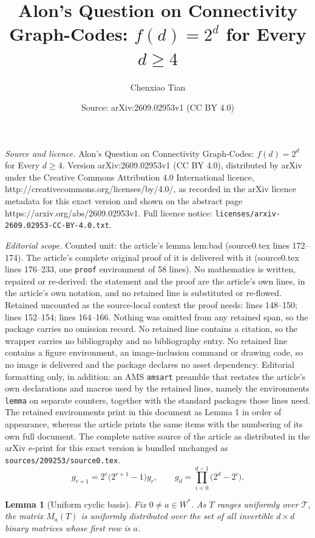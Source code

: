 \documentclass[10pt,a4paper]{amsart}
\title{Alon's Question on Connectivity Graph-Codes: $f(d)=2^d$ for Every $d\geq 4$}
\author{Chenxiao Tian}
\date{Source: arXiv:2609.02953v1 (CC BY 4.0)}
\newtheorem{lemma}{Lemma}
\begin{document}
\maketitle

\noindent\emph{Source and licence.} Alon's Question on Connectivity Graph-Codes: $f(d)=2^d$ for Every $d\geq 4$. Version arXiv:2609.02953v1 (CC BY 4.0), distributed by arXiv under the Creative Commons Attribution 4.0 International licence, http://creativecommons.org/licenses/by/4.0/, as recorded in the arXiv licence metadata for this exact version and shown on the abstract page https://arxiv.org/abs/2609.02953v1. Full licence notice: \texttt{licenses/arxiv-2609.02953-CC-BY-4.0.txt}.\par\smallskip

\noindent\textit{Editorial scope.} Counted unit: the article's lemma lem:bad (source0.tex lines 172--174). The article's complete original proof of it is delivered with it (source0.tex lines 176--233, one \texttt{proof} environment of 58 lines). No mathematics is written, repaired or re-derived: the statement and the proof are the article's own lines, in the article's own notation, and no retained line is substituted or re-flowed.  Retained uncounted as the source-local context the proof needs: lines 148--150; lines 152--154; lines 164--166.  Nothing was omitted from any retained span, so the package carries no omission record.  No retained line contains a citation, so the wrapper carries no bibliography and no bibliography entry.  No retained line contains a figure environment, an image-inclusion command or drawing code, so no image is delivered and the package declares no asset dependency.  Editorial formatting only, in addition: an AMS \texttt{amsart} preamble that restates the article's own declarations and macros used by the retained lines, namely the environments \texttt{lemma} on separate counters, together with the standard packages those lines need.  The retained environments print in this document as Lemma 1 in order of appearance, whereas the article prints the same items with the numbering of its own full document.  The complete native source of the article as distributed in the arXiv e-print for this exact version is bundled unchanged as \texttt{sources/209253/source0.tex}.
\begin{equation}\label{eq:grec}
g_{r+1}=2^{r}\bigl(2^{r+1}-1\bigr)g_{r},\qquad g_{d}=\prod_{i=0}^{d-1}\bigl(2^{d}-2^{i}\bigr).
\end{equation}

\begin{lemma}[Uniform cyclic basis]\label{lem:uniform}
Fix $0\ne a\in W^{*}$. As $T$ ranges uniformly over $\mathcal{T}$, the matrix $M_{a}(T)$ is uniformly distributed over the set of all invertible $d\times d$ binary matrices whose first row is $a$.
\end{lemma}
\end{document}
